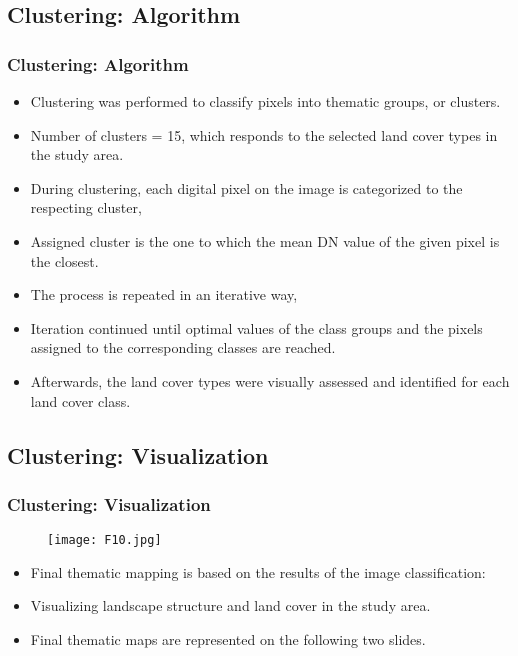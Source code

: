 \documentclass[pdflatex,compress,8pt,
	xcolor={dvipsnames,dvipsnames,svgnames,x11names,table},
	hyperref={
	breaklinks = true, 
	pdfauthor={Lemenkova Polina}, 
	pdfsubject={Preentation}, 
	pdfcreator={Lemenkova Polina}, 
	pdfproducer={Lemenkova Polina}, 
	citecolor=NavyBlue, 
	urlbordercolor=cyan,
	urlcolor = NavyBlue, 
	breaklinks = true}]{beamer}
\begin{document}
\subsection{Clustering: Algorithm}
\begin{frame}\frametitle{Clustering: Algorithm}
\begin{itemize}
	\item Clustering was performed to classify pixels into thematic groups, or clusters.
	\item Number of clusters = 15, which responds to the selected land cover types in the study area.
	\item During clustering, each digital pixel on the image is categorized to the respecting cluster, 
	 \item Assigned cluster is the one to which the mean DN value of the given pixel is the closest.
	\item The process is repeated in an iterative way, 
	\item Iteration continued until optimal values of the class groups and the pixels assigned to the corresponding classes are reached.
	\item Afterwards, the land cover types were visually assessed and identified for each land cover class.
\end{itemize}
\end{frame}

\subsection{Clustering: Visualization}
\begin{frame}\frametitle{Clustering: Visualization}
\begin{figure}[H]
	\centering
		\texttt{[image: F10.jpg]}
\end{figure}
\begin{itemize}
	\item Final thematic mapping is based on the results of the image classification: 
	\item Visualizing landscape structure and land cover in the study area.
	\item Final thematic maps are represented on the following two slides.
\end{itemize}
\end{frame}
\end{document}
